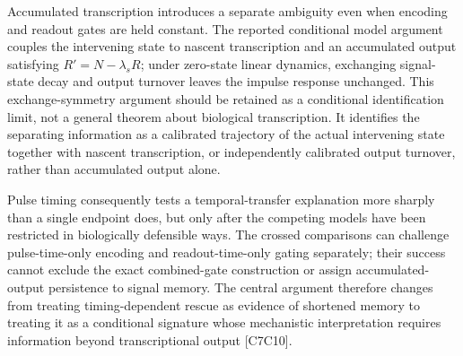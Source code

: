 \documentclass[11pt]{article}
\begin{document}
Accumulated transcription introduces a separate ambiguity even when encoding and readout gates are held constant. The reported conditional model argument couples the intervening state to nascent transcription and an accumulated output satisfying $R'=N-\lambda_sR$; under zero-state linear dynamics, exchanging signal-state decay and output turnover leaves the impulse response unchanged. This exchange-symmetry argument should be retained as a conditional identification limit, not a general theorem about biological transcription. It identifies the separating information as a calibrated trajectory of the actual intervening state together with nascent transcription, or independently calibrated output turnover, rather than accumulated output alone.

Pulse timing consequently tests a temporal-transfer explanation more sharply than a single endpoint does, but only after the competing models have been restricted in biologically defensible ways. The crossed comparisons can challenge pulse-time-only encoding and readout-time-only gating separately; their success cannot exclude the exact combined-gate construction or assign accumulated-output persistence to signal memory. The central argument therefore changes from treating timing-dependent rescue as evidence of shortened memory to treating it as a conditional signature whose mechanistic interpretation requires information beyond transcriptional output [C7\textendash{}\allowbreak{}C10].
\end{document}

